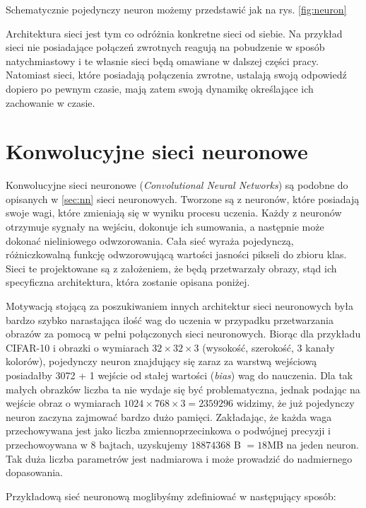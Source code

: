 Schematycznie pojedynczy neuron możemy przedstawić jak na rys. \ref{fig:neuron}

Architektura sieci jest tym co odróżnia konkretne sieci od siebie.
Na przykład sieci nie posiadające połączeń zwrotnych reagują na pobudzenie w sposób natychmiastowy i te własnie sieci będą omawiane w dalszej części pracy.
Natomiast sieci, które posiadają połączenia zwrotne, ustalają swoją odpowiedź dopiero po pewnym czasie, mają zatem swoją dynamikę określające ich zachowanie w czasie. \cite{zuradabarskijedruch1996}



\section{Konwolucyjne sieci neuronowe}\label{sec:cnn}

Konwolucyjne sieci neuronowe (\textit{Convolutional Neural Networks}) są podobne do opisanych w \ref{sec:nn} sieci neuronowych.
Tworzone są z neuronów, które posiadają swoje wagi, które zmieniają się w wyniku procesu uczenia.
Każdy z neuronów otrzymuje sygnały na wejściu, dokonuje ich sumowania, a następnie może dokonać nieliniowego odwzorowania.
Cała sieć wyraża pojedynczą, różniczkowalną funkcję odwzorowującą wartości jasności pikseli do zbioru klas.
Sieci te projektowane są z założeniem, że będą przetwarzały obrazy, stąd ich specyficzna architektura, która zostanie opisana poniżej.

Motywacją stojącą za poszukiwaniem innych architektur sieci neuronowych była bardzo szybko narastająca ilość wag do uczenia w przypadku przetwarzania obrazów za pomocą w pełni połączonych sieci neuronowych.
Biorąc dla przykładu CIFAR-10 i obrazki o wymiarach $ 32 \times 32 \times 3$ (wysokość, szerokość, 3 kanały kolorów), pojedynczy neuron znajdujący się zaraz za warstwą wejściową posiadałby 3072 + 1 wejście od stałej wartości (\textit{bias}) wag do nauczenia.
Dla tak małych obrazków liczba ta nie wydaje się być problematyczna, jednak podając na wejście obraz o wymiarach $1024 \times 768 \times 3 = 2359296$ widzimy, że już pojedynczy neuron zaczyna zajmować bardzo dużo pamięci.
Zakładając, że każda waga przechowywana jest jako liczba zmiennoprzecinkowa o podwójnej precyzji i przechowoywana w 8 bajtach, uzyskujemy $18874368$ B $= 18$MB na jeden neuron.
Tak duża liczba parametrów jest nadmiarowa i może prowadzić do nadmiernego dopasowania.

Przykładową sieć neuronową moglibyśmy zdefiniować w następujący sposób:

